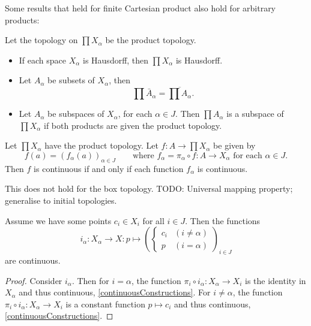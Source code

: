 Some results that held for finite Cartesian product also hold for arbitrary products:
\begin{lemma}
Let the topology on $\prod X_\alpha$ be the product topology.
\begin{itemize}
\item If each space $X_\alpha$ is Hausdorff, then $\prod X_\alpha$ is Hausdorff.
\item Let $A_\alpha$ be subsets of $X_\alpha$, then
\[ \prod \bar{A}_\alpha = \overline{\prod A_\alpha}. \]
\item Let $A_\alpha$ be subspaces of $X_\alpha$, for each $\alpha\in J$. Then $\prod A_\alpha$ is a subspace of $\prod X_\alpha$ if both products are given the product topology.
\end{itemize}
\end{lemma}
\begin{proposition}
Let $\prod X_\alpha$ have the product topology. Let $f:A\to \prod X_\alpha$ be given by
\[ f(a)=(f_\alpha(a))_{\alpha\in J} \qquad \text{where $f_\alpha = \pi_\alpha\circ f:A\to X_\alpha$ for each $\alpha \in J$}.\]
Then $f$ is continuous \textup{if and only if} each function $f_\alpha$ is continuous.
\end{proposition}
This does not hold for the box topology.
TODO: Universal mapping property; generalise to initial topologies.
\begin{corollary} \label{productInclusionsContinuous}
Assume we have some points $c_i \in X_i$ for all $i\in J$. Then the functions
\[ i_\alpha: X_\alpha \to X: p \mapsto \left(\begin{cases}
c_i & (i\neq \alpha) \\ p & (i = \alpha)
\end{cases}\right)_{i\in J} \]
are continuous.
\end{corollary}
\begin{proof}
Consider $i_\alpha$. Then for $i = \alpha$, the function $\pi_i \circ i_\alpha: X_\alpha \to X_i$ is the identity in $X_\alpha$ and thus continuous, \ref{continuousConstructions}. For $i \neq \alpha$, the function $\pi_i \circ i_\alpha: X_\alpha \to X_i$ is a constant function $p \mapsto c_i$ and thus continuous, \ref{continuousConstructions}.
\end{proof}

